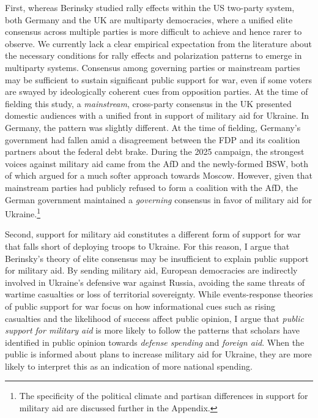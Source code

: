First, whereas Berinsky studied rally effects within the US two-party system, both Germany and the UK are multiparty democracies, where a unified elite consensus across multiple parties is more difficult to achieve and hence rarer to observe. We currently lack a clear empirical expectation from the literature about the necessary conditions for rally effects and polarization patterns to emerge in multiparty systems. Consensus among governing parties or mainstream parties may be sufficient to sustain significant public support for war, even if some voters are swayed by ideologically coherent cues from opposition parties.\autocite{brader_which_2013} At the time of fielding this study, a \textit{mainstream}, cross-party consensus in the UK presented domestic audiences with a unified front in support of military aid for Ukraine. In Germany, the pattern was slightly different. At the time of fielding, Germany’s government had fallen amid a disagreement between the FDP and its coalition partners about the federal debt brake. During the 2025 campaign, the strongest voices against military aid came from the AfD and the newly-formed BSW, both of which argued for a much softer approach towards Moscow. However, given that mainstream parties had publicly refused to form a coalition with the AfD, the German government maintained a \textit{governing} consensus in favor of military aid for Ukraine.\footnote{The specificity of the political climate and partisan differences in support for military aid are discussed further in the Appendix.} 

Second, support for military aid constitutes a different form of support for war that falls short of deploying troops to Ukraine. For this reason, I argue that Berinsky's theory of elite consensus may be insufficient to explain public support for military aid. By sending military aid, European democracies are indirectly involved in Ukraine's defensive war against Russia, avoiding the same threats of wartime casualties or loss of territorial sovereignty. While events-response theories of public support for war focus on how informational cues such as rising casualties and the likelihood of success affect public opinion,\autocite{gelpi_paying_2009, gelpi_success_2005, gelpi_iraq_2007} I argue that \emph{public support for military aid} is more likely to follow the patterns that scholars have identified in public opinion towards \textit{defense spending} and \textit{foreign aid}. When the public is informed about plans to increase military aid for Ukraine, they are more likely to interpret this as an indication of more national spending. 

